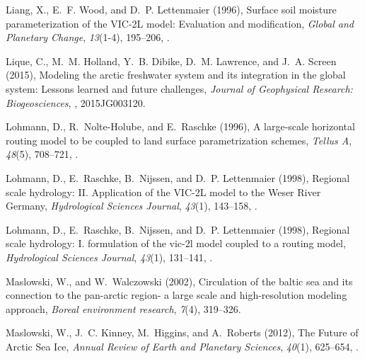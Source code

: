 \documentclass[jgrga, draft]{agutex}
\begin{document}
\begin{article}
\begin{thebibliography}{79}
Liang, X., E.~F. Wood, and D.~P. Lettenmaier (1996), {Surface soil moisture
  parameterization of the {VIC}-2L model: Evaluation and modification},
  \textit{Global and Planetary Change}, \textit{13}(1-4), 195--206,
  .

Lique, C., M.~M. Holland, Y.~B. Dibike, D.~M. Lawrence, and J.~A. Screen
  (2015), Modeling the arctic freshwater system and its integration in the
  global system: Lessons learned and future challenges, \textit{Journal of
  Geophysical Research: Biogeosciences}, ,
  2015JG003120.

Lohmann, D., R.~Nolte-Holube, and E.~Raschke (1996), {A large-scale horizontal
  routing model to be coupled to land surface parametrization schemes},
  \textit{Tellus A}, \textit{48}(5), 708--721,
  .

Lohmann, D., E.~Raschke, B.~Nijssen, and D.~P. Lettenmaier
  (1998{}), {Regional scale hydrology: {II}. Application of the
  {VIC}-2L model to the Weser River Germany}, \textit{Hydrological Sciences
  Journal}, \textit{43}(1), 143--158, .

Lohmann, D., E.~Raschke, B.~Nijssen, and D.~P. Lettenmaier
  (1998{}), Regional scale hydrology: I. formulation of the vic-2l
  model coupled to a routing model, \textit{Hydrological Sciences Journal},
  \textit{43}(1), 131--141, .

Maslowski, W., and W.~Walczowski (2002), Circulation of the baltic sea and its
  connection to the pan-arctic region- a large scale and high-resolution
  modeling approach, \textit{Boreal environment research}, \textit{7}(4),
  319--326.

Maslowski, W., J.~C. Kinney, M.~Higgins, and A.~Roberts (2012), {The Future of
  Arctic Sea Ice}, \textit{Annual Review of Earth and Planetary Sciences},
  \textit{40}(1), 625--654, .


\end{thebibliography}
\end{article}
\end{document}
